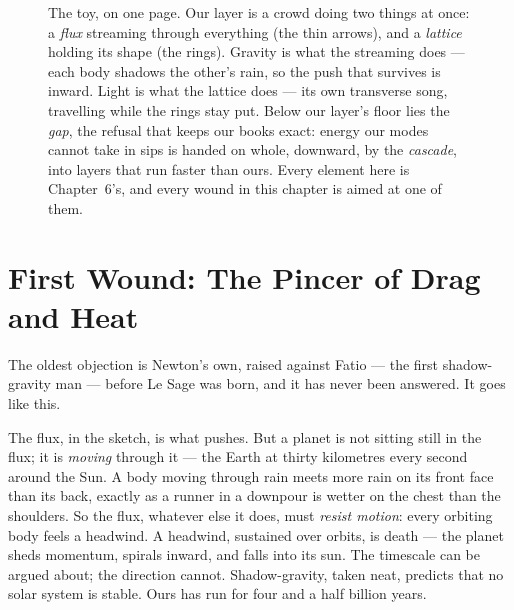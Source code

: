 \documentclass[fontsize=11pt,paper=a4,pagesize=auto,parskip=half-]{scrbook}
\begin{document}
\begin{figure}[htbp]
\caption{The toy, on one page. Our layer is a crowd doing two things at once: a \emph{flux} streaming through everything (the thin arrows), and a \emph{lattice} holding its shape (the rings). Gravity is what the streaming does --- each body shadows the other's rain, so the push that survives is inward. Light is what the lattice does --- its own transverse song, travelling while the rings stay put. Below our layer's floor lies the \emph{gap}, the refusal that keeps our books exact: energy our modes cannot take in sips is handed on whole, downward, by the \emph{cascade}, into layers that run faster than ours. Every element here is Chapter~6's, and every wound in this chapter is aimed at one of them.}
\label{fig:toymap}
\end{figure}

\section{First Wound: The Pincer of Drag and Heat}

The oldest objection is Newton's own, raised against Fatio --- the first shadow-gravity man --- before Le Sage was born, and it has never been answered. It goes like this.

The flux, in the sketch, is what pushes. But a planet is not sitting still in the flux; it is \emph{moving} through it --- the Earth at thirty kilometres every second around the Sun. A body moving through rain meets more rain on its front face than its back, exactly as a runner in a downpour is wetter on the chest than the shoulders. So the flux, whatever else it does, must \emph{resist motion}: every orbiting body feels a headwind. A headwind, sustained over orbits, is death --- the planet sheds momentum, spirals inward, and falls into its sun. The timescale can be argued about; the direction cannot. Shadow-gravity, taken neat, predicts that no solar system is stable. Ours has run for four and a half billion years.
\end{document}
